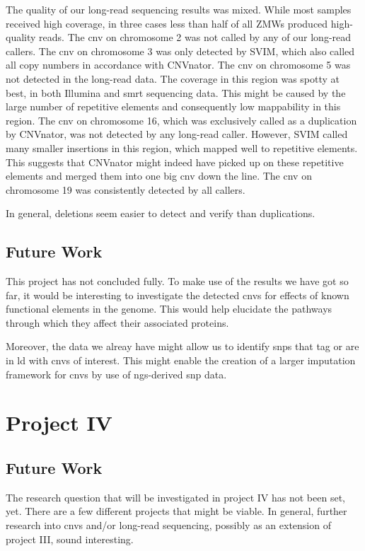 \documentclass[twoside=false]{scrbook}
\begin{document}
The quality of our long-read sequencing results was mixed.
While most samples received high coverage, in three cases less than half of all ZMWs produced high-quality reads.
The \gls{cnv} on chromosome 2 was not called by any of our long-read callers.
The \gls{cnv} on chromosome 3 was only detected by \textsf{SVIM}, which also called all copy numbers in accordance with \textsf{CNVnator}.
The \gls{cnv} on chromosome 5 was not detected in the long-read data.
The coverage in this region was spotty at best, in both Illumina and \gls{smrt} sequencing data.
This might be caused by the large number of repetitive elements and consequently low mappability in this region.
The \gls{cnv} on chromosome 16, which was exclusively called as a duplication by \textsf{CNVnator}, was not detected by any long-read caller.
However, \textsf{SVIM} called many smaller insertions in this region, which mapped well to repetitive elements.
This suggests that \textsf{CNVnator} might indeed have picked up on these repetitive elements and merged them into one big \gls{cnv} down the line.
The \gls{cnv} on chromosome 19 was consistently detected by all callers.

In general, deletions seem easier to detect and verify than duplications.

\section{Future Work}
This project has not concluded fully.
To make use of the results we have got so far, it would be interesting to investigate the detected \glspl{cnv} for effects of known functional elements in the genome.
This would help elucidate the pathways through which they affect their associated proteins.

Moreover, the data we alreay have might allow us to identify \glspl{snp} that tag or are in \gls{ld} with \glspl{cnv} of interest.
This might enable the creation of a larger imputation framework for \glspl{cnv} by use of \gls{ngs}-derived \gls{snp} data.

\chapter{Project IV}
\section{Future Work}
The research question that will be investigated in project IV has not been set, yet.
There are a few different projects that might be viable.
In general, further research into \glspl{cnv} and/or long-read sequencing, possibly as an extension of project III, sound interesting.
\end{document}

